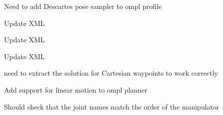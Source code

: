 \begin{DoxyRefList}
\label{todo__todo000026}%
%
Need to add Descartes pose sampler to ompl profile  
\item[Member \mbox{\hyperlink{classtesseract__planning_1_1OMPLDefaultPlanProfile_a46c010d4fcdb918631ac92016d3bfccd}{tesseract\+\_\+planning\+::OMPLDefault\+Plan\+Profile\+::OMPLDefault\+Plan\+Profile}} (const tinyxml2\+::\+XMLElement \&xml\+\_\+element)]\label{todo__todo000023}%
%
Update XML 

\label{todo__todo000024}%
%
Update XML  
\item[Member \mbox{\hyperlink{classtesseract__planning_1_1OMPLDefaultPlanProfile_a9ceeaf8d8a01e483992a71b15cb32df4}{tesseract\+\_\+planning\+::OMPLDefault\+Plan\+Profile\+::to\+XML}} (tinyxml2\+::\+XMLDocument \&doc) const override]\label{todo__todo000028}%
%
Update XML  
\item[Member \mbox{\hyperlink{classtesseract__planning_1_1OMPLMotionPlanner_a26896a1ffb6a331553b3e7dec2af8684}{tesseract\+\_\+planning\+::OMPLMotion\+Planner\+::create\+Problems}} (const \mbox{\hyperlink{structtesseract__planning_1_1PlannerRequest}{Planner\+Request}} \&request) const]\label{todo__todo000022}%
%
need to extract the solution for Cartesian waypoints to work correctly 

\label{todo__todo000020}%
%
Add support for linear motion to ompl planner 

\label{todo__todo000019}%
%
Should check that the joint names match the order of the manipulator 


\end{DoxyRefList}
